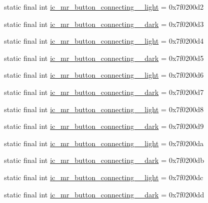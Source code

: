 \begin{CompactItemize}
\item 
static final int \hyperlink{classandroid_1_1support_1_1v7_1_1palette_1_1_r_1_1drawable_08c2b796f3a2caadd1a1ff0a62f61929}{ic\_\-mr\_\-button\_\-connecting\_\_\-light} = 0x7f0200d2
\item 
static final int \hyperlink{classandroid_1_1support_1_1v7_1_1palette_1_1_r_1_1drawable_505c46f144c252b8533fd61c03788563}{ic\_\-mr\_\-button\_\-connecting\_\_\-dark} = 0x7f0200d3
\item 
static final int \hyperlink{classandroid_1_1support_1_1v7_1_1palette_1_1_r_1_1drawable_fe140da4ddfbb9ef4509c074e26c38c2}{ic\_\-mr\_\-button\_\-connecting\_\_\-light} = 0x7f0200d4
\item 
static final int \hyperlink{classandroid_1_1support_1_1v7_1_1palette_1_1_r_1_1drawable_0a005a87efee0ae20631e769eefc9154}{ic\_\-mr\_\-button\_\-connecting\_\_\-dark} = 0x7f0200d5
\item 
static final int \hyperlink{classandroid_1_1support_1_1v7_1_1palette_1_1_r_1_1drawable_b1e6b068a4d9388ec6ba0a3569c41302}{ic\_\-mr\_\-button\_\-connecting\_\_\-light} = 0x7f0200d6
\item 
static final int \hyperlink{classandroid_1_1support_1_1v7_1_1palette_1_1_r_1_1drawable_6b14a6eb7d3e43bdcbf0244571e7b322}{ic\_\-mr\_\-button\_\-connecting\_\_\-dark} = 0x7f0200d7
\item 
static final int \hyperlink{classandroid_1_1support_1_1v7_1_1palette_1_1_r_1_1drawable_69c33f06472a9a24dc31d3b84adbade1}{ic\_\-mr\_\-button\_\-connecting\_\_\-light} = 0x7f0200d8
\item 
static final int \hyperlink{classandroid_1_1support_1_1v7_1_1palette_1_1_r_1_1drawable_a6f1d2215d90820d461921d857f4dbe7}{ic\_\-mr\_\-button\_\-connecting\_\_\-dark} = 0x7f0200d9
\item 
static final int \hyperlink{classandroid_1_1support_1_1v7_1_1palette_1_1_r_1_1drawable_b3120f02d50aa997d58fe488e64ea910}{ic\_\-mr\_\-button\_\-connecting\_\_\-light} = 0x7f0200da
\item 
static final int \hyperlink{classandroid_1_1support_1_1v7_1_1palette_1_1_r_1_1drawable_fdb21bc6aebd06cfc56112b78c264fe4}{ic\_\-mr\_\-button\_\-connecting\_\_\-dark} = 0x7f0200db
\item 
static final int \hyperlink{classandroid_1_1support_1_1v7_1_1palette_1_1_r_1_1drawable_5d135295814441b90f6969c0113febf0}{ic\_\-mr\_\-button\_\-connecting\_\_\-light} = 0x7f0200dc
\item 
static final int \hyperlink{classandroid_1_1support_1_1v7_1_1palette_1_1_r_1_1drawable_57692f8a788681d35a3130a910fe1ae6}{ic\_\-mr\_\-button\_\-connecting\_\_\-dark} = 0x7f0200dd

\end{CompactItemize}
